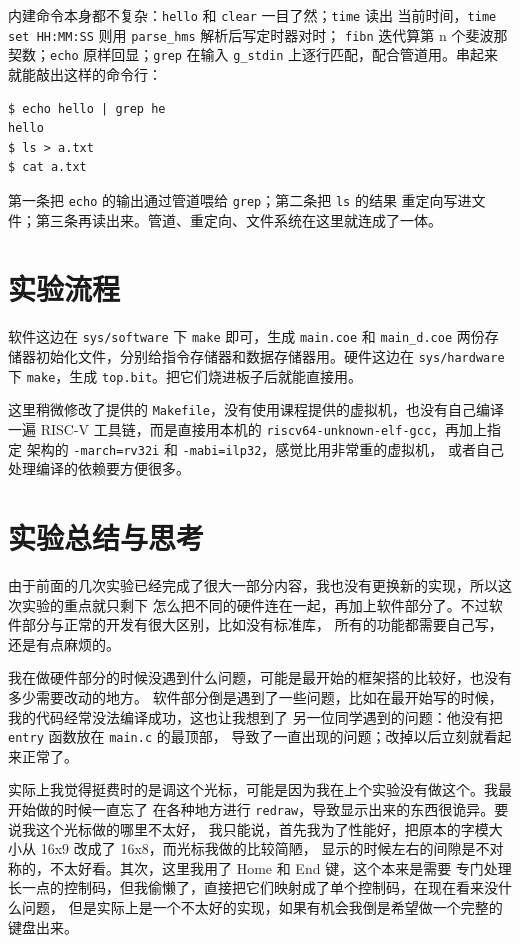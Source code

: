 \documentclass[12pt, a4paper]{ctexart}
\begin{document}
内建命令本身都不复杂：\lstinline|hello| 和 \lstinline|clear| 一目了然；\lstinline|time| 读出
当前时间，\lstinline|time set HH:MM:SS| 则用 \lstinline|parse_hms| 解析后写定时器对时；
\lstinline|fibn| 迭代算第 n 个斐波那契数；\lstinline|echo| 原样回显；\lstinline|grep| 在输入
\lstinline|g_stdin| 上逐行匹配，配合管道用。串起来就能敲出这样的命令行：

\begin{lstlisting}
$ echo hello | grep he
hello
$ ls > a.txt
$ cat a.txt
\end{lstlisting}

第一条把 \lstinline|echo| 的输出通过管道喂给 \lstinline|grep|；第二条把 \lstinline|ls| 的结果
重定向写进文件；第三条再读出来。管道、重定向、文件系统在这里就连成了一体。

\section{实验流程}

软件这边在 \lstinline|sys/software| 下 \lstinline|make| 即可，生成 \lstinline|main.coe| 和
\lstinline|main_d.coe| 两份存储器初始化文件，分别给指令存储器和数据存储器用。硬件这边在
\lstinline|sys/hardware| 下 \lstinline|make|，生成 \lstinline|top.bit|。把它们烧进板子后就能直接用。

这里稍微修改了提供的 \lstinline|Makefile|，没有使用课程提供的虚拟机，也没有自己编译一遍
RISC-V 工具链，而是直接用本机的 \lstinline|riscv64-unknown-elf-gcc|，再加上指定
架构的 \lstinline|-march=rv32i| 和 \lstinline|-mabi=ilp32|，感觉比用非常重的虚拟机，
或者自己处理编译的依赖要方便很多。

\section{实验总结与思考}

由于前面的几次实验已经完成了很大一部分内容，我也没有更换新的实现，所以这次实验的重点就只剩下
怎么把不同的硬件连在一起，再加上软件部分了。不过软件部分与正常的开发有很大区别，比如没有标准库，
所有的功能都需要自己写，还是有点麻烦的。

我在做硬件部分的时候没遇到什么问题，可能是最开始的框架搭的比较好，也没有多少需要改动的地方。
软件部分倒是遇到了一些问题，比如在最开始写的时候，我的代码经常没法编译成功，这也让我想到了
另一位同学遇到的问题：他没有把 \lstinline|entry| 函数放在 \lstinline|main.c| 的最顶部，
导致了一直出现的问题；改掉以后立刻就看起来正常了。

实际上我觉得挺费时的是调这个光标，可能是因为我在上个实验没有做这个。我最开始做的时候一直忘了
在各种地方进行 \lstinline|redraw|，导致显示出来的东西很诡异。要说我这个光标做的哪里不太好，
我只能说，首先我为了性能好，把原本的字模大小从 16x9 改成了 16x8，而光标我做的比较简陋，
显示的时候左右的间隙是不对称的，不太好看。其次，这里我用了 Home 和 End 键，这个本来是需要
专门处理长一点的控制码，但我偷懒了，直接把它们映射成了单个控制码，在现在看来没什么问题，
但是实际上是一个不太好的实现，如果有机会我倒是希望做一个完整的键盘出来。
\end{document}
